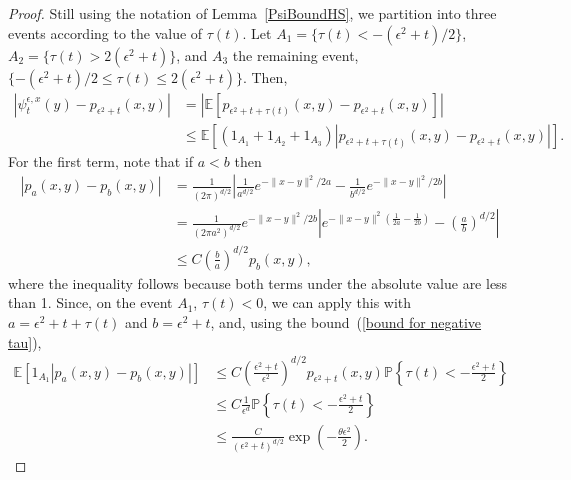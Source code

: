 \documentclass[EJP]{ejpecp} %
\newcommand{\IP}{\mathbb P}
\newcommand{\IE}{\mathbb E}
\begin{document}
\begin{proof}
    Still using the notation of Lemma~\ref{PsiBoundHS},
 we partition into three events according to the value of $\tau(t)$.
    Let $A_1 = \{ \tau(t) < - (\epsilon^2 + t)/2 \}$,
    $A_2 = \{ \tau(t) > 2(\epsilon^2 + t) \}$,
    and $A_3$ the remaining event, $\{ - (\epsilon^2 + t)/2 \le \tau(t) \le 2(\epsilon^2 + t) \}$.
    Then,
    \begin{align*}
        \left|
            \psi_t^{\epsilon, x}(y)
            -
            p_{\epsilon^2 + t}(x, y)
        \right|
        &=
        \left|
        \IE\left[
            p_{\epsilon^2 + t + \tau(t)}(x, y)
            -
            p_{\epsilon^2 + t}(x, y)
        \right]
        \right|
        \\&\le
        \IE\left[
            (1_{A_1} + 1_{A_2} + 1_{A_3})
            \left|
            p_{\epsilon^2 + t + \tau(t)}(x, y)
            -
            p_{\epsilon^2 + t}(x, y)
        \right|
        \right] .
    \end{align*}
    For the first term, note that if $a < b$ then
    \begin{align*}
        |p_a(x, y) - p_b(x, y)| 
        &=
        \frac{1}{(2\pi)^{d/2}}
        \left|
            \frac{1}{a^{d/2}}
            e^{-\|x - y\|^2 / 2a}
            -
            \frac{1}{b^{d/2}}
            e^{-\|x - y\|^2 / 2b}
        \right|
        \\ &=
        \frac{1}{(2\pi a^2)^{d/2}}
            e^{-\|x - y\|^2 / 2b}
        \left|
            e^{-\|x - y\|^2 \left(\frac{1}{2a} - \frac{1}{2b}\right)}
            -
            \left(\frac{a}{b}\right)^{d/2}
        \right|
        \\ &\le
        C \left(\frac{b}{a}\right)^{d/2}
        p_b(x, y) ,
    \end{align*}
    where the inequality follows because both terms under the absolute value 
are less than 1.
Since, on the event $A_1$, $\tau(t)<0$, we can  
apply this with $a = \epsilon^2 + t + \tau(t)$ and $b = \epsilon^2 + t$,
and, using the bound~(\ref{bound for negative tau}),
    \begin{align*}
        \IE\left[
            1_{A_1} |p_a(x, y) - p_b(x, y)| 
        \right]
        & \le
            C \left(\frac{\epsilon^2 + t}{\epsilon^2}\right)^{d/2}
            p_{\epsilon^2 + t}(x, y) 
            \IP\left\{ \tau(t) < - \frac{\epsilon^2 + t}{2} \right\}
        \\ & \le
            C \frac{1}{\epsilon^d}
            \IP\left\{ \tau(t) < - \frac{\epsilon^2 + t}{2} \right\}
        \\ & \le
	    \frac{C}{(\epsilon^2+t)^{d/2}} \exp\left(-\frac{\theta \epsilon^2}{2} \right) .
    \end{align*}


\end{proof}
\end{document}
